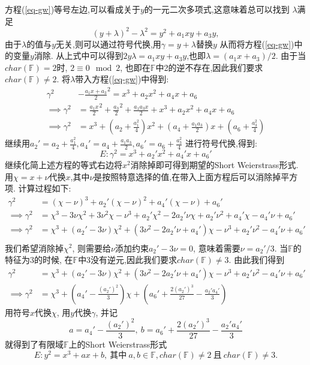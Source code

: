 \documentclass{article}
\newcommand{\F}{\mathbb{F}}
\begin{document}
方程(\ref{eq-gw})等号左边,可以看成关于$y$的一元二次多项式,这意味着总可以找到
$\lambda$满足
$$(y+\lambda)^2 - \lambda^2 = y^2 + a_1xy + a_3y,$$
由于$\lambda$的值与$y$无关,则可以通过符号代换,用$\gamma = y + \lambda$替换$y$
从而将方程(\ref{eq-gw})中的变量$y$消除. 
从上式中可以得到$2y\lambda = a_1xy + a_3y$,也即$\lambda = (a_1x + a_3) / 2$.
由于当$char(\F) = 2$时, $2\equiv 0\mod 2$, 也即在$\F$中2的逆不存在,因此我们要求$char(\F)\neq 2$.
将$\lambda$带入方程(\ref{eq-gw})中得到:
\begin{equation*}
\begin{split}
\gamma^2 & - \frac{a_1x + a_3}{2}^2 =  x^3 + a_2x^2 + a_4x + a_6 \\
\implies \gamma^2 & = \frac{a_1x}{2}^2 + \frac{a_3}{2}^2 + \frac{a_1a_3x}{2} + x^3 + a_2x^2 + a_4x + a_6\\
\implies \gamma^2  & = x^3 + (a_2 + \frac{a_1^2}{4})x^2 + (a_4 + \frac{a_1a_3}{2})x + (a_6 + \frac{a_3^2}{4})
\end{split}
\end{equation*}
继续用$a_2' = a_2 + \frac{a_1^2}{4}, a_4' = a_4 + \frac{a_1a_3}{2}, a_6' = a_6 + \frac{a_3^2}{4}$
进行符号代换,得到:
$$
E: \gamma^2 = x^3 + a_2'x^2 + a_4'x + a_6'
$$
继续化简上述方程的等式右边将$x^2$消除掉即可得到期望的Short Weierstrass形式.
用$\chi = x + \nu$代换$x$,其中$\nu$是按照特意选择的值,在带入上面方程后可以消除掉平方项.
计算过程如下:
\begin{equation*}
\begin{split}
\gamma^2 & = (\chi - \nu)^3 + a_2'(\chi - \nu)^2 + a_4'(\chi - \nu) + a_6' \\
\implies \gamma^2 & = \chi^3 -3\nu\chi^2 + 3\nu^2\chi - \nu^3 + a_2'\chi^2 -2a_2'\nu\chi + a_2'\nu^2 + a_4'\chi - a_4'\nu + a_6' \\
\implies \gamma^2 & = \chi^3 + (a_2' - 3\nu)\chi^2 + (3\nu^2 - 2a_2'\nu + a_4')\chi - \nu^3 + a_2'\nu^2 - a_4'\nu + a_6'\\
\end{split}
\end{equation*}
我们希望消除掉$\chi^2$, 则需要给$\nu$添加约束$a_2'-3\nu = 0$, 意味着需要$\nu = a_2' / 3$.
当$\F$的特征为3的时候, 在$\F$中3没有逆元,因此我们要求$char(\F)\neq3$. 由此我们得到
\begin{equation*}
\begin{split}
\gamma^2 & = \chi^3 + (a_2' - 3\nu)\chi^2 + (3\nu^2 - 2a_2'\nu + a_4')\chi - \nu^3 + a_2'\nu^2 - a_4'\nu + a_6'\\
\implies \gamma^2 & = \chi^3 + \left(a_4'-\frac{(a_2')^2}{3}\right)\chi + \left(a_6' + \frac{2(a_2')^3}{27} - \frac{a_2'a_4'}{3}\right)
\end{split}
\end{equation*}
用符号$x$代换$\chi$, 用$y$代换$\gamma$, 并记
$$a = a_4'-\frac{(a_2')^2}{3},\  b = a_6' + \frac{2(a_2')^3}{27} - \frac{a_2'a_4'}{3}$$
就得到了有限域$\F$上的Short Weierstrass形式
$$E: y^2 = x^3 + ax + b,\ \text{其中}\ a, b \in \F, char(\F) \neq 2 \ \text{且}\ char(\F) \neq 3.$$
\end{document}

